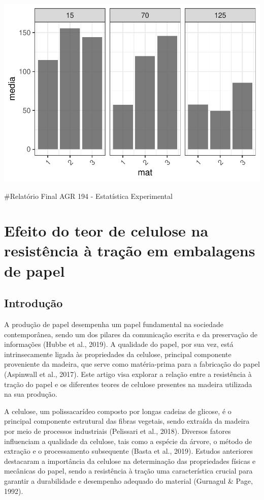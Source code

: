 \documentclass[
]{book}
\begin{document}
\includegraphics{_main_files/figure-latex/unnamed-chunk-12-1.pdf}

\#Relatório Final AGR 194 - Estatística Experimental

\section{Efeito do teor de celulose na resistência à tração em embalagens de papel}\label{efeito-do-teor-de-celulose-na-resistuxeancia-uxe0-trauxe7uxe3o-em-embalagens-de-papel}

\subsection{Introdução}\label{introduuxe7uxe3o-4}

A produção de papel desempenha um papel fundamental na sociedade contemporânea, sendo um dos pilares da comunicação escrita e da preservação de informações (Hubbe et al., 2019). A qualidade do papel, por sua vez, está intrinsecamente ligada às propriedades da celulose, principal componente proveniente da madeira, que serve como matéria-prima para a fabricação do papel (Aspinwall et al., 2017). Este artigo visa explorar a relação entre a resistência à tração do papel e os diferentes teores de celulose presentes na madeira utilizada na sua produção.

A celulose, um polissacarídeo composto por longas cadeias de glicose, é o principal componente estrutural das fibras vegetais, sendo extraída da madeira por meio de processos industriais (Pelissari et al., 2018). Diversos fatores influenciam a qualidade da celulose, tais como a espécie da árvore, o método de extração e o processamento subsequente (Basta et al., 2019). Estudos anteriores destacaram a importância da celulose na determinação das propriedades físicas e mecânicas do papel, sendo a resistência à tração uma característica crucial para garantir a durabilidade e desempenho adequado do material (Gurnagul \& Page, 1992).
\end{document}
